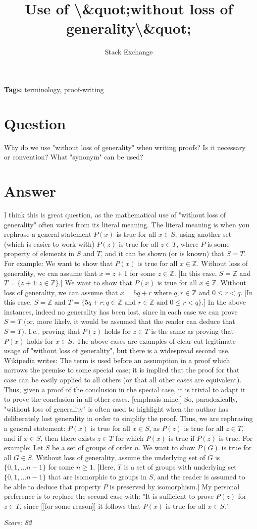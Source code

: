 \documentclass{article}
\title{Use of \textbackslash{}&quot;without loss of generality\textbackslash{}&quot;}
\author{Stack Exchange}
\date{}
\begin{document}
\maketitle

\noindent\textbf{Tags:} terminology, proof-writing

\section*{Question}
Why do we use "without loss of generality" when writing proofs? Is it necessary or convention? What "synonym" can be used?

\section*{Answer}
I think this is great question, as the mathematical use of "without loss of generality" often varies from its literal meaning. The literal meaning is when you rephrase a general statement $P(x)$ is true for all $x \in S$, using another set (which is easier to work with) $P(z)$ is true for all $z \in T$, where $P$ is some property of elements in $S$ and $T$, and it can be shown (or is known) that $S=T$. For example: We want to show that $P(x)$ is true for all $x \in \mathbb{Z}$. Without loss of generality, we can assume that $x=z+1$ for some $z \in \mathbb{Z}$. [In this case, $S=\mathbb{Z}$ and $T=\{z+1:z \in \mathbb{Z}\}$.] We want to show that $P(x)$ is true for all $x \in \mathbb{Z}$. Without loss of generality, we can assume that $x=5q+r$ where $q,r \in \mathbb{Z}$ and $0 \leq r < q$. [In this case, $S=\mathbb{Z}$ and $T=\{5q+r:q \in \mathbb{Z} \text{ and } r \in \mathbb{Z} \text{ and } 0 \leq r < q\}$.] In the above instances, indeed no generality has been lost, since in each case we can prove $S=T$ (or, more likely, it would be assumed that the reader can deduce that $S=T$). I.e., proving that $P(z)$ holds for $z \in T$ is the same as proving that $P(x)$ holds for $x \in S$. The above cases are examples of clear-cut legitimate usage of "without loss of generality", but there is a widespread second use. Wikipedia writes: The term is used before an assumption in a proof which narrows the premise to some special case; it is implied that the proof for that case can be easily applied to all others (or that all other cases are equivalent). Thus, given a proof of the conclusion in the special case, it is trivial to adapt it to prove the conclusion in all other cases. [emphasis mine.] So, paradoxically, "without loss of generality" is often used to highlight when the author has deliberately lost generality in order to simplify the proof. Thus, we are rephrasing a general statement: $P(x)$ is true for all $x \in S$, as $P(z)$ is true for all $z \in T$, and if $x \in S$, then there exists $z \in T$ for which $P(x)$ is true if $P(z)$ is true. For example: Let $S$ be a set of groups of order $n$. We want to show $P(G)$ is true for all $G \in S$. Without loss of generality, assume the underlying set of $G$ is $\{0,1,\ldots n-1\}$ for some $n \geq 1$. [Here, $T$ is a set of groups with underlying set $\{0,1,\ldots n-1\}$ that are isomorphic to groups in $S$, and the reader is assumed to be able to deduce that property $P$ is preserved by isomorphism.] My personal preference is to replace the second case with: "It is sufficient to prove $P(z)$ for $z \in T$, since [[for some reason]] it follows that $P(x)$ is true for all $x \in S$."

\vspace{1em}
\noindent\textit{Score: 82}
\end{document}
